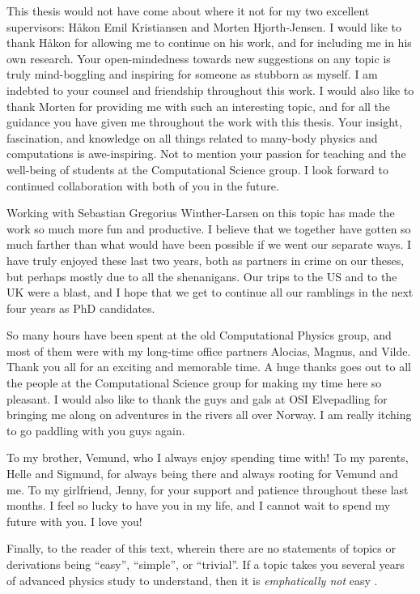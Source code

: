 This thesis would not have come about where it not for my two excellent
supervisors: Håkon Emil Kristiansen and Morten Hjorth-Jensen.
I would like to thank Håkon for allowing me to continue on his work, and for
including me in his own research.
Your open-mindedness towards new suggestions on any topic is truly mind-boggling
and inspiring for someone as stubborn as myself.
I am indebted to your counsel and friendship throughout this work.
I would also like to thank Morten for providing me with such an interesting
topic, and for all the guidance you have given me throughout the work with this
thesis.
Your insight, fascination, and knowledge on all things related to many-body
physics and computations is awe-inspiring.
Not to mention your passion for teaching and the well-being of students at the
Computational Science group.
I look forward to continued collaboration with both of you in the future.

Working with Sebastian Gregorius Winther-Larsen on this topic has made the work
so much more fun and productive.
I believe that we together have gotten so much farther than what would have been
possible if we went our separate ways.
I have truly enjoyed these last two years, both as partners in crime on our
theses, but perhaps mostly due to all the shenanigans.
Our trips to the US and to the UK were a blast, and I hope that we get to
continue all our ramblings in the next four years as PhD candidates.

So many hours have been spent at the old Computational Physics group, and most
of them were with my long-time office partners Alocias, Magnus, and Vilde.
Thank you all for an exciting and memorable time.
A huge thanks goes out to all the people at the Computational Science group for
making my time here so pleasant.
I would also like to thank the guys and gals at OSI Elvepadling for bringing me
along on adventures in the rivers all over Norway.
I am really itching to go paddling with you guys again.

To my brother, Vemund, who I always enjoy spending time with!
To my parents, Helle and Sigmund, for always being there and always rooting for
Vemund and me.
To my girlfriend, Jenny, for your support and patience throughout these last
months.
I feel so lucky to have you in my life, and I cannot wait to spend my future
with you.
I love you!

Finally, to the reader of this text, wherein there are no statements of topics
or derivations being ``easy'', ``simple'', or ``trivial''.
If a topic takes you several years of advanced physics study to understand, then
it is \emph{emphatically not} easy \cite{nontrivial-manifesto}.
